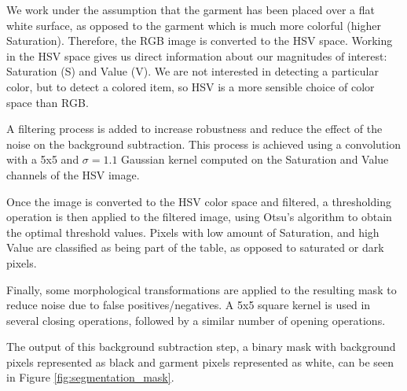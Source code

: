 We work under the assumption that the garment has been placed over a flat white surface, as opposed to the garment which is much more colorful (higher Saturation). Therefore, the RGB image is converted to the HSV space. Working in the HSV space gives us direct information about our magnitudes of interest: Saturation (S) and Value (V). We are not interested in detecting a particular color, but to detect a colored item, so HSV is a more sensible choice of color space than RGB. 

A filtering process is added to increase robustness and reduce the effect of the noise on the background subtraction. This process is achieved using a convolution with a 5x5 and $\sigma=1.1$ Gaussian kernel computed on the Saturation and Value channels of the HSV image.

Once the image is converted to the HSV color space and filtered, a thresholding operation is then applied to the filtered image, using Otsu's algorithm \cite{otsu1975threshold} to obtain the optimal threshold values. Pixels with low amount of Saturation, and high Value are classified as being part of the table, as opposed to saturated or dark pixels.

Finally, some morphological transformations are applied to the resulting mask to reduce noise due to false positives/negatives. A 5x5 square kernel is used in several closing operations, followed by a similar number of opening operations. 

The output of this background subtraction step, a binary mask with background pixels represented as black and garment pixels represented as white, can be seen in Figure \ref{fig:segmentation_mask}.



